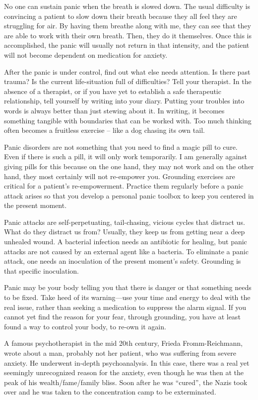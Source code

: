 \documentclass[]{book}
\begin{document}
No one can sustain panic when the breath is slowed down. The usual difficulty is convincing a patient to slow down their breath because they all feel they are struggling for air. By having them breathe along with me, they can see that they are able to work with their own breath. Then, they do it themselves. Once this is accomplished, the panic will usually not return in that intensity, and the patient will not become dependent on medication for anxiety.

After the panic is under control, find out what else needs attention. Is there past trauma? Is the current life-situation full of difficulties? Tell your therapist. In the absence of a therapist, or if you have yet to establish a safe therapeutic relationship, tell yourself by writing into your diary. Putting your troubles into words is always better than just stewing about it. In writing, it becomes something tangible with boundaries that can be worked with. Too much thinking often becomes a fruitless exercise -- like a dog chasing its own tail.

Panic disorders are not something that you need to find a magic pill to cure. Even if there is such a pill, it will only work temporarily. I am generally against giving pills for this because on the one hand, they may not work and on the other hand, they most certainly will not re-empower you. Grounding exercises are critical for a patient's re-empowerment. Practice them regularly before a panic attack arises so that you develop a personal panic toolbox to keep you centered in the present moment.

Panic attacks are self-perpetuating, tail-chasing, vicious cycles that distract us. What do they distract us from? Usually, they keep us from getting near a deep unhealed wound. A bacterial infection needs an antibiotic for healing, but panic attacks are not caused by an external agent like a bacteria. To eliminate a panic attack, one needs an inoculation of the present moment's safety. Grounding is that specific inoculation.

Panic may be your body telling you that there is danger or that something needs to be fixed. Take heed of its warning---use your time and energy to deal with the real issue, rather than seeking a medication to suppress the alarm signal. If you cannot yet find the reason for your fear, through grounding, you have at least found a way to control your body, to re-own it again.

A famous psychotherapist in the mid 20th century, Frieda Fromm-Reichmann, wrote about a man, probably not her patient, who was suffering from severe anxiety. He underwent in-depth psychoanalysis. In this case, there was a real yet seemingly unrecognized reason for the anxiety, even though he was then at the peak of his wealth/fame/family bliss. Soon after he was ``cured'', the Nazis took over and he was taken to the concentration camp to be exterminated.
\end{document}
